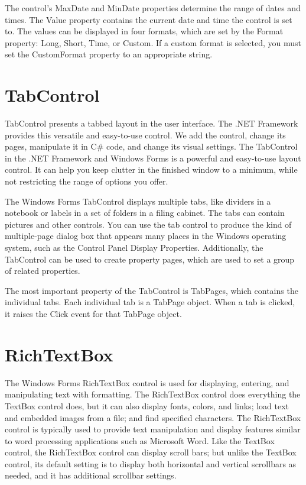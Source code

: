 The control's MaxDate and MinDate properties determine the range of dates and times. The Value
property contains the current date and time the control is set to. The values can be displayed in four
formats, which are set by the Format property: Long, Short, Time, or Custom. If a custom format is
selected, you must set the CustomFormat property to an appropriate string.

\section{TabControl}
TabControl presents a tabbed layout in the user interface. The .NET Framework provides this
versatile and easy-to-use control. We add the control, change its pages, manipulate it in C\# code,
and change its visual settings. The TabControl in the .NET Framework and Windows Forms is a
powerful and easy-to-use layout control. It can help you keep clutter in the finished window to a
minimum, while not restricting the range of options you offer.

The Windows Forms TabControl displays multiple tabs, like dividers in a notebook or labels in a set
of folders in a filing cabinet. The tabs can contain pictures and other controls. You can use the tab
control to produce the kind of multiple-page dialog box that appears many places in the Windows
operating system, such as the Control Panel Display Properties. Additionally, the TabControl can be
used to create property pages, which are used to set a group of related properties.

The most important property of the TabControl is TabPages, which contains the individual tabs.
Each individual tab is a TabPage object. When a tab is clicked, it raises the Click event for that
TabPage object.

\section{RichTextBox}
The Windows Forms RichTextBox control is used for displaying, entering, and manipulating text
with formatting. The RichTextBox control does everything the TextBox control does, but it can also
display fonts, colors, and links; load text and embedded images from a file; and find specified
characters. The RichTextBox control is typically used to provide text manipulation and display
features similar to word processing applications such as Microsoft Word. Like the TextBox control,
the RichTextBox control can display scroll bars; but unlike the TextBox control, its default setting is
to display both horizontal and vertical scrollbars as needed, and it has additional scrollbar settings.

